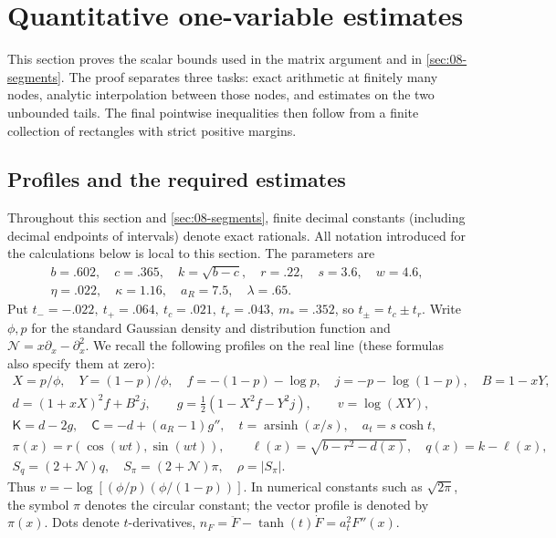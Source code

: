 \section{Quantitative one-variable estimates}\label{sec:07-scalar}

This section proves the scalar bounds used in the matrix argument and in \cref{sec:08-segments}. The proof separates three tasks: exact arithmetic at finitely many nodes, analytic interpolation between those nodes, and estimates on the two unbounded tails. The final pointwise inequalities then follow from a finite collection of rectangles with strict positive margins.

\subsection{Profiles and the required estimates}

Throughout this section and \cref{sec:08-segments}, finite decimal constants (including decimal endpoints of intervals) denote exact rationals. All notation introduced for the calculations below is local to this section. The parameters are
\[
\begin{gathered}
 b=.602,\quad c=.365,\quad k=\sqrt{b-c},\quad r=.22,\quad s=3.6,\quad w=4.6,\\
 \eta=.022,\quad \kappa=1.16,\quad a_R=7.5,\quad \lambda=.65.
\end{gathered}
\]
Put $t_-= -.022,\ t_+=.064,\ t_c=.021,\ t_r=.043,\ m_*=.352$, so $t_\pm=t_c\pm t_r$. Write $\phi,p$ for the standard Gaussian density and distribution function and $\mathcal{N}=x\partial_x-\partial_x^2$. We recall the following profiles on the real line (these formulas also specify them at zero):
\[
\begin{aligned}
 X=p/\phi,\quad Y=(1-p)/\phi,\quad f=-(1-p)-\log p,\quad j=-p-\log(1-p),\quad B=1-xY,\\
 d=(1+xX)^2 f+B^2j,\qquad g=\tfrac12(1-X^2f-Y^2j),\qquad
 v=\log(XY),\\
 \mathsf K=d-2g,\quad \mathsf C=-d+(a_R-1)g'',\quad t=\operatorname{arsinh}(x/s),\quad a_t=s\cosh t,\\
 \pi(x)=r(\cos(wt),\sin(wt)),\qquad \ell(x)=\sqrt{b-r^2-d(x)},\quad q(x)=k-\ell(x),\\
 S_q=(2+\mathcal{N})q,\quad S_\pi=(2+\mathcal{N})\pi,\quad \rho=|S_\pi|.
\end{aligned}
\]
Thus $v=-\log[(\phi/p)(\phi/(1-p))]$. In numerical constants such as $\sqrt{2\pi}$, the symbol $\pi$ denotes the circular constant; the vector profile is denoted by $\pi(x)$. Dots denote $t$-derivatives, $n_F=\ddot F-\tanh(t)\dot F=a_t^2 F''(x)$.


